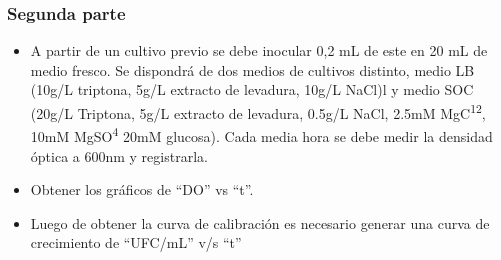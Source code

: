 \subsubsection{Segunda parte}

\begin{itemize}
    \item A partir de un cultivo previo se debe inocular 0,2 mL de este en 20 mL de medio fresco. Se dispondrá de dos medios de cultivos distinto, medio LB (10g/L triptona, 5g/L extracto de levadura, 10g/L NaCl)l y medio SOC (20g/L Triptona, 5g/L extracto de levadura, 0.5g/L NaCl, 2.5mM MgC\textsuperscript{12}, 10mM MgSO\textsuperscript{4} 20mM glucosa). Cada media hora se debe medir la densidad óptica a 600nm y registrarla.
    \item Obtener los gráficos de “DO” vs “t”.
    \item Luego de obtener la curva de calibración es necesario generar una curva de crecimiento de “UFC/mL” v/s “t” 
\end{itemize}
